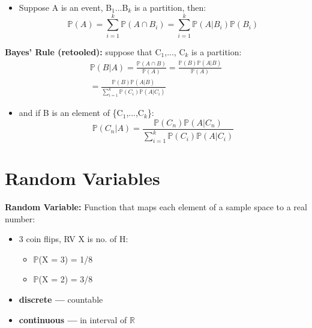 \documentclass[10pt, letterpaper, twoside]{article}
\begin{document}
\begin{multicols}{2}
\begin{itemize}
    \item Suppose A is an event, B$_1$...B$_k$ is a partition, then:
    \begin{equation*}
        \mathbb{P}(A) = \sum_{i=1}^k\mathbb{P}(A\cap B_i) = \sum_{i=1}^k\mathbb{P}(A|B_i)\mathbb{P}(B_i)
    \end{equation*}
\end{itemize}
\textbf{Bayes' Rule (retooled):} suppose that C$_1$,..., C$_k$ is a partition:
\begin{equation*}
    \begin{split}
        \mathbb{P}(B|A) = \frac{\mathbb{P}(A\cap B)}{\mathbb{P}(A)} = \frac{\mathbb{P}(B)\mathbb{P}(A|B)}{\mathbb{P}(A)} \\
        = \frac{\mathbb{P}(B)\mathbb{P}(A|B)}{\sum_{i=1}^k\mathbb{P}(C_i)\mathbb{P}(A|C_i)}
    \end{split}
\end{equation*}
\begin{itemize}
    \item and if B is an element of \{C$_1$,...,C$_k$\}:
    \begin{equation*}
        \mathbb{P}(C_n|A) = \frac{\mathbb{P}(C_n)\mathbb{P}(A|C_n)}{\sum_{i=1}^k\mathbb{P}(C_i)\mathbb{P}(A|C_i)}
    \end{equation*}
\end{itemize}
\vfill\pagebreak
\section{Random Variables}

\textbf{Random Variable:} Function that maps each element of a sample space to a real number:

\begin{itemize}
    \item 3 coin flips, RV X is no. of H:
    \begin{itemize}
        \item $\mathbb{P}$(X = 3) = 1/8
        \item $\mathbb{P}$(X = 2) = 3/8
    \end{itemize}
    \item \textbf{discrete ---} countable
    \item \textbf{continuous ---} in interval of $\mathbb{R}$
\end{itemize}

\end{multicols}
\end{document}
